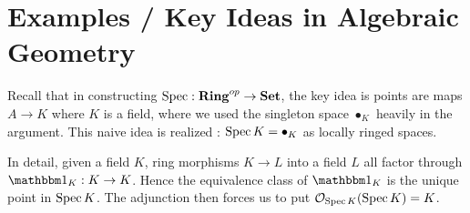 \section{Examples / Key Ideas in Algebraic Geometry}

\begin{eg}
  
  Recall that in constructing $\operatorname{Spec} : \mathbf{Ring}^{op} \to \mathbf{Set}$,
  the key idea is points are maps $A \to K$ where $K$ is a field,
  where we used the singleton space $\bullet_K$ heavily in the argument.
  This naive idea is realized : 
  $\operatorname{Spec} K = \bullet_K$ as locally ringed spaces. 

  In detail, 
  given a field $K$, 
  ring morphisms $K \to L$ into a field $L$ all factor through 
  $\id{K} : K \to K$.
  Hence the equivalence class of $\id{K}$ is the unique point in $\operatorname{Spec} K$.
  The adjunction then forces us to put 
  $\mathcal{O}_{\operatorname{Spec} K}(\operatorname{Spec} K) = K$.

\end{eg}

